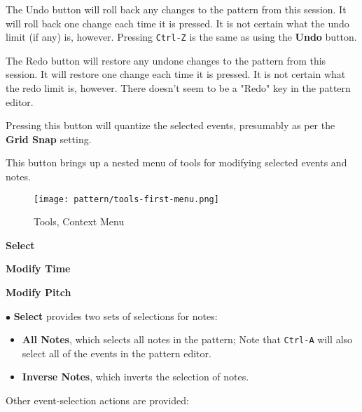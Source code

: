    \setcounter{ItemCounter}{0}      %

   The Undo button will roll back any changes to the pattern from this
   session.
   It will roll back one change each time it is pressed.
   It is not certain what the undo limit (if any) is, however.
   Pressing \texttt{Ctrl-Z} is the same as using the \textbf{Undo} button.

   The Redo button will restore any undone changes to the pattern from this
   session.
   It will restore one change each time it is pressed.
   It is not certain what the redo limit is, however.
   There doesn't seem to be a "Redo" key in the pattern editor.

   Pressing this button will quantize the selected events, presumably as per
   the \textbf{Grid Snap} setting.

   This button brings up a nested menu of tools for modifying selected
   events and notes.

\begin{figure}[H]
   \centering 
   \texttt{[image: pattern/tools-first-menu.png]}
   \caption{Tools, Context Menu}
   \label{fig:pattern_editor_tools_first_menu}
\end{figure}

   \begin{enumber}
      \item \textbf{Select}
      \item \textbf{Modify Time}
      \item \textbf{Modify Pitch}
   \end{enumber}

   $\bullet$ \textbf{Select} provides two sets of selections for notes:
   \begin{itemize}
      \item \textbf{All Notes}, which selects all notes in the pattern;
         Note that  \texttt{Ctrl-A} will also select
         all of the events in the pattern editor.
      \item \textbf{Inverse Notes}, which inverts the selection of notes.
   \end{itemize}

   Other event-selection actions are provided:

